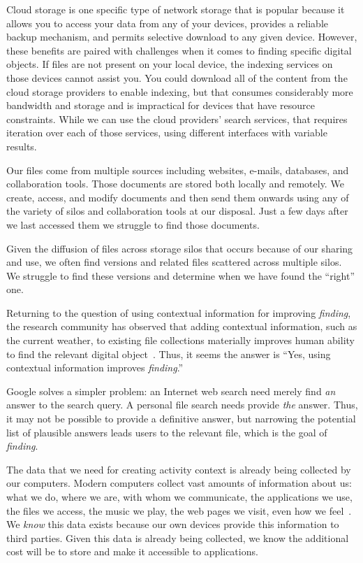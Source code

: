 Cloud storage is one specific type of network storage that is popular because it
allows you to access your data from any of your devices, provides a reliable
backup mechanism, and permits selective download to any given device. However,
these benefits are paired with challenges when it comes to finding specific
digital objects.  If files are not present on your local device, the indexing
services on those devices cannot assist you.  You could download all of the
content from the cloud storage providers to enable indexing, but that consumes
considerably more bandwidth and storage and is impractical for devices that have
resource constraints.  While we can use the cloud providers' search services, that
requires iteration over each of those services, using different interfaces with
variable results.

Our files come from multiple sources including websites, e-mails, databases,
and collaboration tools.  Those documents are stored both locally and remotely.
We create, access, and modify documents and then send them onwards using any of
the variety of silos and collaboration tools at our disposal.  Just a few days
after we last accessed them we struggle to find those
documents.

Given the diffusion of files across storage silos that occurs because of our
sharing and use, we often find versions and related files scattered across
multiple silos. We struggle to find these versions and determine when we have
found the ``right'' one.

Returning to the question of using contextual information for improving
\emph{finding}, the research community has observed that adding
contextual information, such as the current weather, to existing file
collections materially improves human ability to find the relevant digital
object~\cite{vianna2019thesis,10.1145/1559845.1559992,dumais2016stuff}. Thus, it
seems the answer is ``Yes, using contextual information improves
\emph{finding}.''

Google solves a simpler problem: an Internet web search need merely find
\emph{an} answer to the search query.  A personal file search needs provide
\emph{the} answer. Thus, it may not be possible to provide a definitive answer,
but narrowing the potential list of plausible answers leads users to the
relevant file, which is the goal of \emph{finding}.

The data that we need for creating activity context is already being collected
by our computers. Modern computers collect vast amounts of information about us:
what we do, where we are, with whom we communicate, the applications we use, the
files we access, the music we play, the web pages we visit, even how we
feel~\cite{chakriswaran2019emotion,8933554}.  We \emph{know} this
data exists because our own devices provide this information to third parties.
Given this data is already being collected, we know the additional cost will be
to store and make it accessible to applications.


